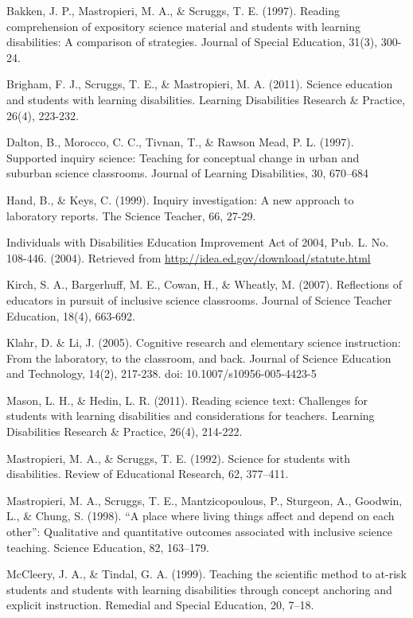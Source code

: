 \documentclass[11.5pt]{sig-alternate} %
\begin{document}
\leftskip 0.25in
\parindent -0.25in 
Bakken, J. P., Mastropieri, M. A., \& Scruggs, T. E. (1997). Reading comprehension of expository science material and students with learning disabilities: A comparison of strategies. Journal of Special Education, 31(3), 300-24.

Brigham, F. J., Scruggs, T. E., \& Mastropieri, M. A. (2011). Science education and students with learning disabilities. Learning Disabilities Research \& Practice, 26(4), 223-232.

Dalton, B., Morocco, C. C., Tivnan, T., \& Rawson Mead, P. L. (1997). Supported inquiry science: Teaching for conceptual change in urban and suburban science classrooms. Journal of Learning Disabilities, 30, 670–684

Hand, B., \& Keys, C. (1999). Inquiry investigation: A new approach to laboratory reports. The Science Teacher, 66, 27-29.

Individuals with Disabilities Education Improvement Act of 2004, Pub. L. No. 108-446. (2004). Retrieved from \url{http://idea.ed.gov/download/statute.html}

Kirch, S. A., Bargerhuff, M. E., Cowan, H., \& Wheatly, M. (2007). Reflections of educators in pursuit of inclusive science classrooms. Journal of Science Teacher Education, 18(4), 663-692.

Klahr, D. \& Li, J. (2005). Cognitive research and elementary science instruction: From the laboratory, to the classroom, and back. Journal of Science Education and Technology, 14(2), 217-238. doi: 10.1007/s10956-005-4423-5

Mason, L. H., \& Hedin, L. R. (2011). Reading science text: Challenges for students with learning disabilities and considerations for teachers. Learning Disabilities Research \& Practice, 26(4), 214-222.

Mastropieri, M. A., \& Scruggs, T. E. (1992). Science for students with disabilities. Review of Educational Research, 62, 377–411.

Mastropieri, M. A., Scruggs, T. E., Mantzicopoulous, P., Sturgeon, A., Goodwin, L., \& Chung, S. (1998). “A place where living things affect and depend on each other”: Qualitative and quantitative outcomes associated with inclusive science teaching. Science Education, 82, 163–179.

McCleery, J. A., \& Tindal, G. A. (1999). Teaching the scientific method to at-risk students and students with learning disabilities through concept anchoring and explicit instruction. Remedial and Special Education, 20, 7–18.
\end{document}
